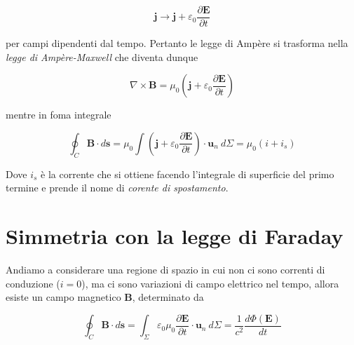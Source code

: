 \begin{tcolorbox}[colback=yellow!10!white, colframe=orange!70!black, boxrule=0.8pt]
\begin{equation}
    \mathbf{j} \to \mathbf{j} + \varepsilon_0\frac{\partial \mathbf{E}}{\partial t}
\end{equation}
\end{tcolorbox}

per campi dipendenti dal tempo. Pertanto le legge di Ampère si trasforma nella \emph{legge di Ampère-Maxwell} che diventa dunque 

\begin{tcolorbox}[colback=yellow!10!white, colframe=orange!70!black, boxrule=0.8pt]
\begin{equation}
    \nabla \times \mathbf{B} = \mu_0 \left( \mathbf{j} + \varepsilon_0 \frac{\partial \mathbf{E}}{\partial t} \right)
\end{equation}
\end{tcolorbox}

\newpage

mentre in foma integrale 

\begin{tcolorbox}[colback=yellow!10!white, colframe=orange!70!black, boxrule=0.8pt]
\begin{equation}
    \oint_{C} \mathbf{B} \cdot d \mathbf{s} = \mu_0 \int \left( \mathbf{j} + \varepsilon_0 \frac{\partial \mathbf{E}}{\partial t} \right) \cdot \mathbf{u}_n \ d\Sigma = \mu_0 (i + i_s) 
\end{equation}
\end{tcolorbox}

Dove $i_s$ è la corrente che si ottiene facendo l'integrale di superficie del primo termine e prende il nome di \emph{corente di spostamento}. 

\section{Simmetria con la legge di Faraday}

Andiamo a considerare una regione di spazio in cui non ci sono correnti di conduzione ($i = 0$), ma ci sono variazioni di campo elettrico nel tempo, allora esiste un campo magnetico $\mathbf{B}$, determinato da 

\begin{tcolorbox}[colback=yellow!10!white, colframe=orange!70!black, boxrule=0.8pt]
\begin{equation}
    \oint_{C} \mathbf{B} \cdot d \mathbf{s} = \int_{\Sigma} \varepsilon_0 \mu_0 \frac{\partial \mathbf{E}}{\partial t} \cdot \mathbf{u}_n \ d\Sigma = \frac{1}{c^2} \frac{d \Phi (\mathbf{E})}{dt}
\end{equation}
\end{tcolorbox}

